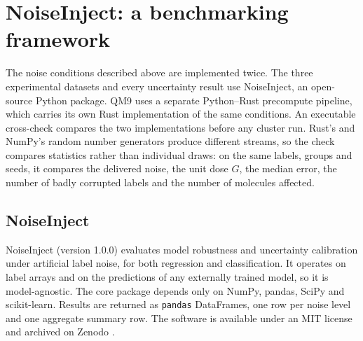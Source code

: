 \section{NoiseInject: a benchmarking framework}

The noise conditions described above are implemented twice. The three experimental datasets and
every uncertainty result use NoiseInject, an open-source Python package. QM9 uses a separate
Python--Rust precompute pipeline, which carries its own Rust implementation of the same conditions.
An executable cross-check compares the two implementations before any cluster run. Rust's and
NumPy's random number generators produce different streams, so the check compares statistics rather
than individual draws: on the same labels, groups and seeds, it compares the delivered noise, the
unit dose $G$, the median error, the number of badly corrupted labels and the number of molecules
affected.

\subsection{NoiseInject}

NoiseInject (version 1.0.0) evaluates model robustness and uncertainty calibration under artificial
label noise, for both regression and classification. It operates on label arrays and on the
predictions of any externally trained model, so it is model-agnostic. The core package depends only
on NumPy, pandas, SciPy and scikit-learn. Results are returned as \texttt{pandas} DataFrames, one
row per noise level and one aggregate summary row. The software is available under an MIT license
and archived on Zenodo \citep{noiseinject}.

